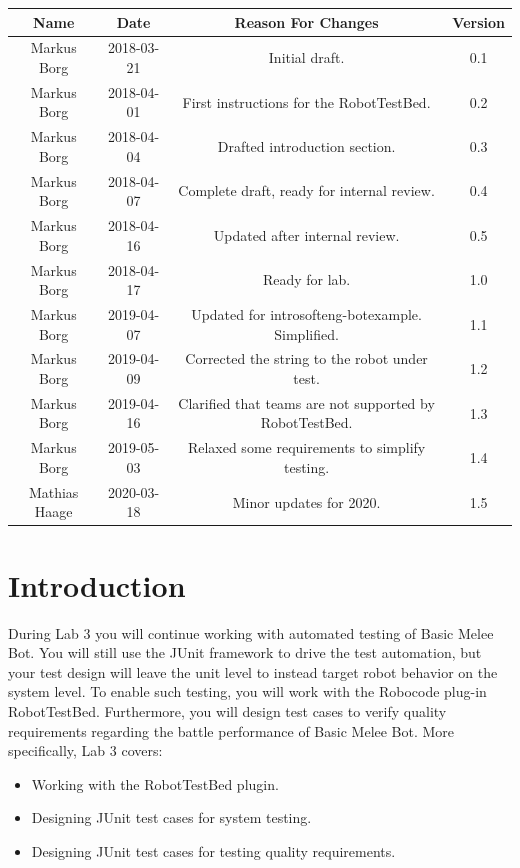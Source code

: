\documentclass{scrreprt}
\begin{document}
\begin{center}
    \begin{tabular}{|c|c|c|c|}
        \hline
	    Name & Date & Reason For Changes & Version\\
        \hline
	    Markus Borg & 2018-03-21 & Initial draft. & 0.1\\
        \hline
        Markus Borg & 2018-04-01 & First instructions for the RobotTestBed. & 0.2\\
        \hline
        Markus Borg & 2018-04-04 & Drafted introduction section. & 0.3\\
        \hline
        Markus Borg & 2018-04-07 & Complete draft, ready for internal review. & 0.4\\
        \hline
        Markus Borg & 2018-04-16 & Updated after internal review. & 0.5\\
        \hline
        Markus Borg & 2018-04-17 & Ready for lab. & 1.0\\
        \hline
        Markus Borg & 2019-04-07 & Updated for introsofteng-botexample. Simplified. & 1.1\\
        \hline
        Markus Borg & 2019-04-09 & Corrected the string to the robot under test. & 1.2\\
        \hline
        Markus Borg & 2019-04-16 & Clarified that teams are not supported by RobotTestBed. & 1.3\\
        \hline
        Markus Borg & 2019-05-03 & Relaxed some requirements to simplify testing. & 1.4\\
        \hline
        Mathias Haage & 2020-03-18 & Minor updates for 2020. & 1.5\\
        \hline
    \end{tabular}
\end{center}

\chapter{Introduction}
During Lab 3 you will continue working with automated testing of Basic Melee Bot. You will still use the JUnit framework to drive the test automation, but your test design will leave the unit level to instead target robot behavior on the system level. To enable such testing, you will work with the Robocode plug-in RobotTestBed. Furthermore, you will design test cases to verify quality requirements regarding the battle performance of Basic Melee Bot. More specifically, Lab 3 covers:

\begin{itemize}
\item Working with the RobotTestBed plugin.
\item Designing JUnit test cases for system testing.
\item Designing JUnit test cases for testing quality requirements.
\end{itemize}
\end{document}

